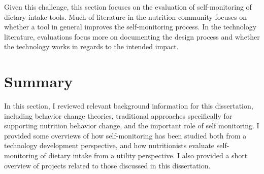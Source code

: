 Given this challenge, this section focuses on the evaluation of self-monitoring of dietary intake tools. 
Much of literature in the nutrition community focuses on whether a tool in general improves the self-monitoring process. In the technology literature, evaluations focus more on documenting the design process and whether the technology works in regards to the intended impact. 






\section{Summary}In this section, I reviewed relevant background information for this dissertation, including behavior change theories, traditional approaches specifically for supporting nutrition behavior change, and the important role of  self monitoring. I provided some overviews of how self-monitoring has been studied both from a technology development perspective, and how nutritionists evaluate self-monitoring of dietary intake from a utility perspective. I also provided a short overview of projects related to those discussed in this dissertation. 
